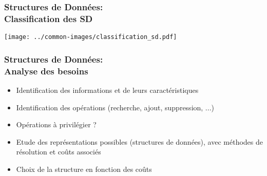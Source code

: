 \documentclass[table,handout,tikz,12pt,svgnames]{beamer}
\begin{document}
\begin{frame}[fragile=singleslide]
	\frametitle{Structures de Données:\\Classification des SD}
		{\texttt{[image: ../common-images/classification\_sd.pdf]}}
\end{frame}

\begin{frame}[fragile=singleslide]
	\frametitle{Structures de Données:\\Analyse des besoins}
	\begin{block}{}
		\begin{itemize}
			\item Identification des informations et de leurs caractéristiques
			\item Identification des opérations (recherche, ajout, suppression, ...)
			\item Opérations à privilégier ?
			\item Etude des représentations possibles (structures de données), avec méthodes de résolution et coûts associés
			\item Choix de la structure en fonction des coûts
		\end{itemize}
	\end{block}
\end{frame}
\end{document}
